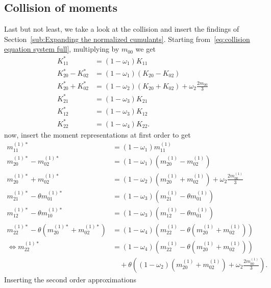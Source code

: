 \subsection{Collision of moments}
\label{sub:Collision of moments}
Last but not least, we take a look at the collision and insert the findings of Section~\ref{sub:Expanding the normalized cumulants}.
Starting from~\eqref{eq:collision equation system full}, multiplying by $m_{00}$ we get
\begin{equation}
  \begin{aligned}
    K_{11}^{*} & = (1-\omega_1)K_{11} \\
    K_{20}^{*} - K_{02}^{*} & = (1-\omega_1) (K_{20} - K_{02}) \\
    K_{20}^{*} + K_{02}^{*} & = (1-\omega_2) (K_{20} + K_{02}) + \omega_2 \frac{2 m_{00}}{3} \\
    K_{21}^{*} & = (1-\omega_3)K_{21} \\
    K_{12}^{*} & = (1-\omega_3)K_{12} \\
    K_{22}^{*} & = (1-\omega_4)K_{22}.
  \end{aligned}
\end{equation}
now, insert the moment representations at first order to get
\begin{equation}
  \begin{aligned}
    m_{11}^{(1)*}
    & = (1-\omega_1)m_{11}^{(1)} \\
%
    m_{20}^{(1)*} - m_{02}^{(1)*}
    & = (1-\omega_1) (m_{20}^{(1)} - m_{02}^{(1)}) \\
%
    m_{20}^{(1)*} + m_{02}^{(1)*}
    & = (1-\omega_2) (m_{20}^{(1)} + m_{02}^{(1)}) + \omega_2 \frac{2 m_{00}^{(1)}}{3} \\
%
    m_{21}^{(1)*} - \theta m_{01}^{(1)*}
    & = (1-\omega_3)(m_{21}^{(1)} - \theta m_{01}^{(1)}) \\
%
    m_{12}^{(1)*} - \theta m_{10}^{(1)*}
    & = (1-\omega_3)(m_{12}^{(1)} - \theta m_{01}^{(1)}) \\
%
    m_{22}^{(1)*} - \theta (m_{20}^{(1)*} + m_{02}^{(1)*})
    & = (1-\omega_4)(m_{22}^{(1)} - \theta (m_{20}^{(1)} + m_{02}^{(1)})) \\
\Leftrightarrow
    m_{22}^{(1)*}
    & = (1-\omega_4)(m_{22}^{(1)} - \theta (m_{20}^{(1)} + m_{02}^{(1)}))
    \\&\quad
    + \theta ((1-\omega_2) (m_{20}^{(1)} + m_{02}^{(1)}) + \omega_2 \frac{2 m_{00}^{(1)}}{3}) .
  \end{aligned}
\end{equation}
Inserting the second order approximations
